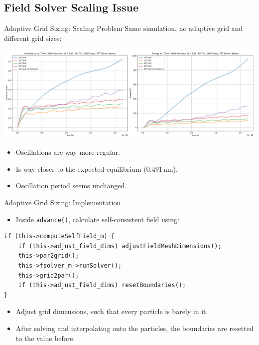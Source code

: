 \subsection{Field Solver Scaling Issue}

\begin{frame}{Adaptive Grid Sizing: Scaling Problem}
    Same simulation, no adaptive grid and different grid sizes:
    \begin{minipage}{\textwidth}
        \centering
        \includegraphics[width=\textwidth]{ressources/additional/disorder_heating_grid_comparison.pdf}
    \end{minipage}
    \begin{itemize}
        \item Oscillations are way more regular.
        \item Is way closer to the expected equilibrium ($0.491\,\si{\nano\metre}$).
        \item Oscillation period seems unchanged.
    \end{itemize}
\end{frame}

\begin{frame}[fragile]{Adaptive Grid Sizing: Implementation}
    \begin{itemize}
        \item Inside \verb|advance()|, calculate self-consistent field using:
    \end{itemize}
\begin{lstlisting}
if (this->computeSelfField_m) {
    if (this->adjust_field_dims) adjustFieldMeshDimensions(); 
    this->par2grid();
    this->fsolver_m->runSolver();
    this->grid2par();
    if (this->adjust_field_dims) resetBoundaries();
}
\end{lstlisting}
    \begin{itemize}
    \item Adjust grid dimensions, such that every particle is barely in it.
    \item After solving and interpolating onto the particles, the boundaries are resetted to the value before.
    \end{itemize}
\end{frame}


